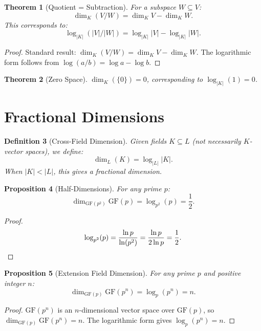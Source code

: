 \documentclass[11pt]{article}
\newtheorem{definition}{Definition}[section]
\newtheorem{theorem}[definition]{Theorem}
\newtheorem{proposition}[definition]{Proposition}
\begin{document}
\begin{theorem}[Quotient = Subtraction]
\label{thm:quotient}
For a subspace $W \subseteq V$:
\[
\dim_K(V/W) = \dim_K V - \dim_K W.
\]
This corresponds to:
\[
\log_{|K|}(|V|/|W|) = \log_{|K|} |V| - \log_{|K|} |W|.
\]
\end{theorem}

\begin{proof}
Standard result: $\dim_K(V/W) = \dim_K V - \dim_K W$. The logarithmic form follows from $\log(a/b) = \log a - \log b$.
\end{proof}

\begin{theorem}[Zero Space]
\label{thm:zero}
$\dim_K(\{0\}) = 0$, corresponding to $\log_{|K|}(1) = 0$.
\end{theorem}

\section{Fractional Dimensions}
\label{sec:fractional}

\begin{definition}[Cross-Field Dimension]
Given fields $K \subseteq L$ (not necessarily $K$-vector spaces), we define:
\[
\dim_{L}(K) = \log_{|L|} |K|.
\]
When $|K| < |L|$, this gives a fractional dimension.
\end{definition}

\begin{proposition}[Half-Dimensions]
\label{prop:half}
For any prime $p$:
\[
\dim_{\text{GF}(p^2)} \text{GF}(p) = \log_{p^2}(p) = \frac{1}{2}.
\]
\end{proposition}

\begin{proof}
\[
\log_{p^2}(p) = \frac{\ln p}{\ln(p^2)} = \frac{\ln p}{2 \ln p} = \frac{1}{2}. \qedhere
\]
\end{proof}

\begin{proposition}[Extension Field Dimension]
\label{prop:extension}
For any prime $p$ and positive integer $n$:
\[
\dim_{\text{GF}(p)} \text{GF}(p^n) = \log_p(p^n) = n.
\]
\end{proposition}

\begin{proof}
$\text{GF}(p^n)$ is an $n$-dimensional vector space over $\text{GF}(p)$, so $\dim_{\text{GF}(p)} \text{GF}(p^n) = n$. The logarithmic form gives $\log_p(p^n) = n$.
\end{proof}
\end{document}
